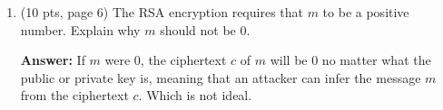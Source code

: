 \documentclass[10pt]{article}
\begin{document}
\begin{enumerate}
\bigskip\item (10 pts, page 6) The RSA encryption requires that $m$ to be a positive number. Explain why $m$ should not be 0.

\textbf{Answer:} \newline If $m$ were 0, the ciphertext $c$ of $m$ will be 0 no matter what the public or private key is, meaning that an attacker can infer the message $m$ from the ciphertext $c$. Which is not ideal.
\end{enumerate}
\end{document}
